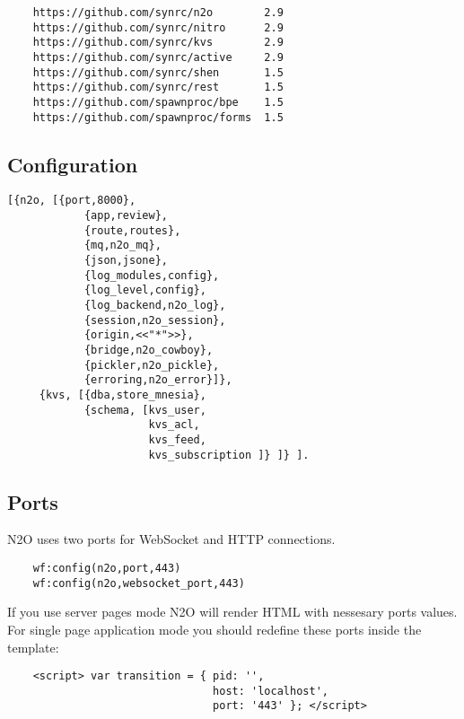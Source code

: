 \vspace{1\baselineskip}
\begin{lstlisting}
    https://github.com/synrc/n2o        2.9
    https://github.com/synrc/nitro      2.9
    https://github.com/synrc/kvs        2.9
    https://github.com/synrc/active     2.9
    https://github.com/synrc/shen       1.5
    https://github.com/synrc/rest       1.5
    https://github.com/spawnproc/bpe    1.5
    https://github.com/spawnproc/forms  1.5
\end{lstlisting}
\vspace{1\baselineskip}

\newpage
\subsection{Configuration}

\vspace{1\baselineskip}
\begin{lstlisting}[caption=sys.config]
    [{n2o, [{port,8000},
            {app,review},
            {route,routes},
            {mq,n2o_mq},
            {json,jsone},
            {log_modules,config},
            {log_level,config},
            {log_backend,n2o_log},
            {session,n2o_session},
            {origin,<<"*">>},
            {bridge,n2o_cowboy},
            {pickler,n2o_pickle},
            {erroring,n2o_error}]},
     {kvs, [{dba,store_mnesia},
            {schema, [kvs_user,
                      kvs_acl,
                      kvs_feed,
                      kvs_subscription ]} ]} ].
\end{lstlisting}
\vspace{1\baselineskip}


\subsection*{Ports}
N2O uses two ports for WebSocket and HTTP connections.

\vspace{1\baselineskip}
\begin{lstlisting}
    wf:config(n2o,port,443)
    wf:config(n2o,websocket_port,443)
\end{lstlisting}
\vspace{1\baselineskip}

If you use server pages mode N2O will render HTML with nessesary ports values.
For single page application mode you should redefine these ports inside the template:

\vspace{1\baselineskip}
\begin{lstlisting}
    <script> var transition = { pid: '',
                                host: 'localhost',
                                port: '443' }; </script>
\end{lstlisting}
\vspace{1\baselineskip}

